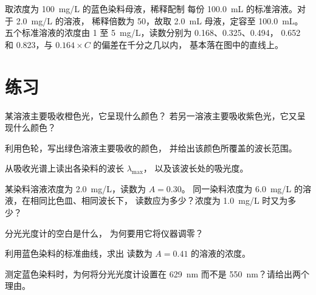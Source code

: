 \begin{example}[五个标准溶液]\label{ex:g11:absorbance:standards}
取浓度为 \qty{100}{mg/L} 的蓝色染料母液，稀释配制
每份 \qty{100.0}{mL} 的标准溶液。对于 \qty{2.0}{mg/L} 的溶液，
稀释倍数为 50，故取 \qty{2.0}{mL} 母液，定容至 \qty{100.0}{mL}。
五个标准溶液的浓度由 1 至 \qty{5}{mg/L}，读数分别为 0.168、0.325、0.494，
0.652 和 0.823，与 $0.164 \times C$ 的偏差在千分之几以内，
基本落在图中的直线上。
\end{example}

\section{练习}

\begin{exercise}[$\star$]\label{exo:g11:absorbance:1}
某溶液主要吸收橙色光，它呈现什么颜色？
若另一溶液主要吸收紫色光，它又呈现什么颜色？
\end{exercise}

\begin{exercise}[$\star$]\label{exo:g11:absorbance:2}
利用色轮，写出绿色溶液主要吸收的颜色，
并给出该颜色所覆盖的波长范围。
\end{exercise}

\begin{exercise}[$\star$]\label{exo:g11:absorbance:3}
从吸收光谱上读出各染料的波长 $\lambda_{\max}$，
以及该波长处的吸光度。
\end{exercise}

\begin{exercise}[$\star$]\label{exo:g11:absorbance:4}
某染料溶液浓度为 \qty{2.0}{mg/L}，读数为 $A = 0.30$。
同一染料浓度为 \qty{6.0}{mg/L} 的溶液，在相同比色皿、相同波长下，
读数应为多少？浓度为 \qty{1.0}{mg/L} 时又为多少？
\end{exercise}

\begin{exercise}[$\star$]\label{exo:g11:absorbance:5}
分光光度计的空白是什么，
为何要用它将仪器调零？
\end{exercise}

\begin{exercise}[$\star\star$]\label{exo:g11:absorbance:6}
利用蓝色染料的标准曲线，求出
读数为 $A = 0.41$ 的溶液的浓度。
\end{exercise}

\begin{exercise}[$\star\star$]\label{exo:g11:absorbance:7}
测定蓝色染料时，为何将分光光度计设置在
\qty{629}{nm} 而不是 \qty{550}{nm}？请给出两个理由。
\end{exercise}

